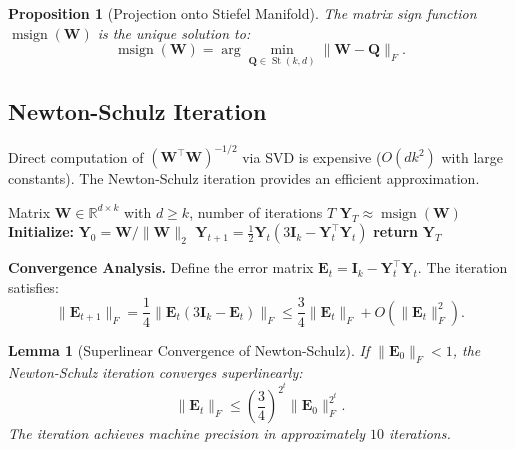 \documentclass[twocolumn]{article}
\newtheorem{lemma}{Lemma}
\newtheorem{proposition}{Proposition}
\DeclareMathOperator{\msign}{msign}
\DeclareMathOperator{\St}{St}
\begin{document}
\begin{proposition}[Projection onto Stiefel Manifold]
The matrix sign function $\msign(\mathbf{W})$ is the unique solution to:
\begin{equation}
\msign(\mathbf{W}) = \arg\min_{\mathbf{Q} \in \St(k, d)} \|\mathbf{W} - \mathbf{Q}\|_F.
\end{equation}
\end{proposition}

\subsection{Newton-Schulz Iteration}
\label{sec:newton-schulz}

Direct computation of $(\mathbf{W}^\top \mathbf{W})^{-1/2}$ via SVD is expensive ($O(dk^2)$ with large constants). The Newton-Schulz iteration provides an efficient approximation.

\begin{algorithm}[H]
\caption{Newton-Schulz Iteration for Matrix Sign Function}
\label{alg:newton-schulz}
\begin{algorithmic}[1]
\REQUIRE Matrix $\mathbf{W} \in \mathbb{R}^{d \times k}$ with $d \geq k$, number of iterations $T$
\ENSURE $\mathbf{Y}_T \approx \msign(\mathbf{W})$
\STATE \textbf{Initialize:} $\mathbf{Y}_0 = \mathbf{W} / \|\mathbf{W}\|_2$ 
    \STATE $\mathbf{Y}_{t+1} = \frac{1}{2} \mathbf{Y}_t (3\mathbf{I}_k - \mathbf{Y}_t^\top \mathbf{Y}_t)$
\ENDFOR
\STATE \textbf{return} $\mathbf{Y}_T$
\end{algorithmic}
\end{algorithm}

\textbf{Convergence Analysis.} Define the error matrix $\mathbf{E}_t = \mathbf{I}_k - \mathbf{Y}_t^\top \mathbf{Y}_t$. The iteration satisfies:
\begin{equation}
\|\mathbf{E}_{t+1}\|_F = \frac{1}{4} \|\mathbf{E}_t(3\mathbf{I}_k - \mathbf{E}_t)\|_F \leq \frac{3}{4} \|\mathbf{E}_t\|_F + O(\|\mathbf{E}_t\|_F^2).
\end{equation}

\begin{lemma}[Superlinear Convergence of Newton-Schulz]
If $\|\mathbf{E}_0\|_F < 1$, the Newton-Schulz iteration converges superlinearly:
\begin{equation}
\|\mathbf{E}_t\|_F \leq \left(\frac{3}{4}\right)^{2^t} \|\mathbf{E}_0\|_F^{2^t}.
\end{equation}
The iteration achieves machine precision in approximately $10$ iterations.
\end{lemma}
\end{document}
